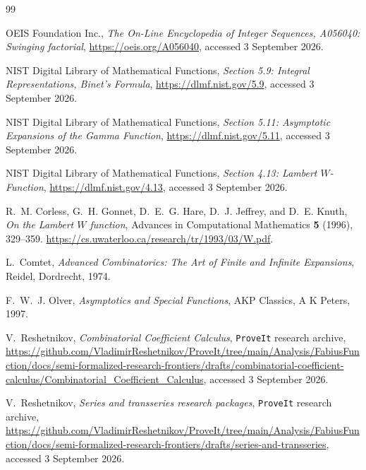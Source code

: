 \documentclass[11pt]{article}
\theoremstyle{definition}
\theoremstyle{remark}
\begin{document}
\begin{thebibliography}{99}

OEIS Foundation Inc.,
\emph{The On-Line Encyclopedia of Integer Sequences, A056040: Swinging factorial},
\url{https://oeis.org/A056040}, accessed 3 September 2026.

NIST Digital Library of Mathematical Functions,
\emph{Section 5.9: Integral Representations, Binet's Formula},
\url{https://dlmf.nist.gov/5.9}, accessed 3 September 2026.

NIST Digital Library of Mathematical Functions,
\emph{Section 5.11: Asymptotic Expansions of the Gamma Function},
\url{https://dlmf.nist.gov/5.11}, accessed 3 September 2026.

NIST Digital Library of Mathematical Functions,
\emph{Section 4.13: Lambert $W$-Function},
\url{https://dlmf.nist.gov/4.13}, accessed 3 September 2026.

R.~M. Corless, G.~H. Gonnet, D.~E.~G. Hare, D.~J. Jeffrey, and D.~E. Knuth,
\emph{On the Lambert $W$ function},
Advances in Computational Mathematics \textbf{5} (1996), 329--359.
\url{https://cs.uwaterloo.ca/research/tr/1993/03/W.pdf}.

L.~Comtet,
\emph{Advanced Combinatorics: The Art of Finite and Infinite Expansions},
Reidel, Dordrecht, 1974.

F.~W.~J. Olver,
\emph{Asymptotics and Special Functions},
AKP Classics, A K Peters, 1997.

V.~Reshetnikov,
\emph{Combinatorial Coefficient Calculus},
\texttt{ProveIt} research archive,
\url{https://github.com/VladimirReshetnikov/ProveIt/tree/main/Analysis/FabiusFunction/docs/semi-formalized-research-frontiers/drafts/combinatorial-coefficient-calculus/Combinatorial_Coefficient_Calculus},
accessed 3 September 2026.

V.~Reshetnikov,
\emph{Series and transseries research packages},
\texttt{ProveIt} research archive,
\url{https://github.com/VladimirReshetnikov/ProveIt/tree/main/Analysis/FabiusFunction/docs/semi-formalized-research-frontiers/drafts/series-and-transseries},
accessed 3 September 2026.

\end{thebibliography}
\end{document}
